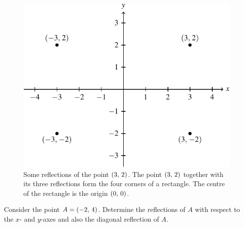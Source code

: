 \documentclass[a4paper,oneside,12pt]{article}
\begin{document}
\begin{figure}[!htbp]
\centering
\includegraphics[scale=1.1]{image/03/reflection.pdf}
\caption{%
  Some reflections of the point $\left\lparen{3},\, {2}\right\rparen$.  The point
  $\left\lparen{3},\, {2}\right\rparen$ together with its three reflections form the four
  corners of a rectangle.  The centre of the rectangle is the origin
  $\left\lparen{0},\, {0}\right\rparen$.
}
\label{fig:reflections_of_point}
\end{figure}

\begin{exercise}
Consider the point $A = \left\lparen{-2},\, {4}\right\rparen$.  Determine the reflections of
$A$ with respect to the $x$- and $y$-axes and also the diagonal
reflection of $A$.
\end{exercise}
\end{document}
